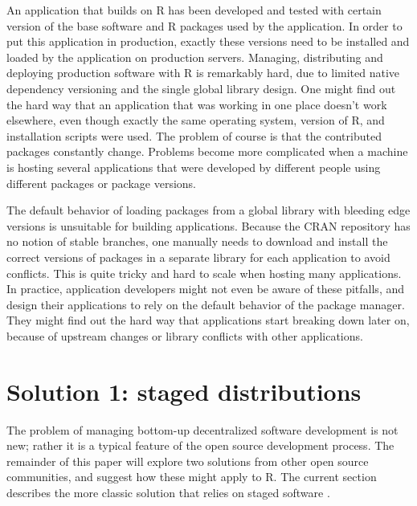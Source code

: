 An application that builds on R has been developed and tested with certain version of the base
software and R packages used by the application. In order to put this
application in production, exactly these versions need to be installed and
loaded by the application on production servers. Managing, distributing and
deploying production software with R is remarkably hard, due to limited native
dependency versioning and the single global library design. One might find out
the hard way that an application that was working in one place doesn't work
elsewhere, even though exactly the same operating system, version of R, and
installation scripts were used. The problem of course is that the contributed
packages constantly change. Problems become more complicated when a machine is
hosting several applications that were developed by different people using
different packages or package versions.

The default behavior of loading packages from a global library with bleeding
edge versions is unsuitable for building applications. Because the CRAN
repository has no notion of stable branches, one manually needs to download and
install the correct versions of packages in a separate library for each
application to avoid conflicts. This is quite tricky and hard to scale when
hosting many applications. In practice, application developers might not even be
aware of these pitfalls, and design their applications to rely on the default
behavior of the package manager. They might find out the hard way that
applications start breaking down later on, because of upstream changes or
library conflicts with other applications.

\section{Solution 1: staged distributions}

The problem of managing bottom-up decentralized software development is not
new; rather it is a typical feature of the open source development
process. The remainder of this paper will explore two solutions from other open
source communities, and suggest how these might apply to R. The current section
describes the more classic solution that relies on staged software
.


